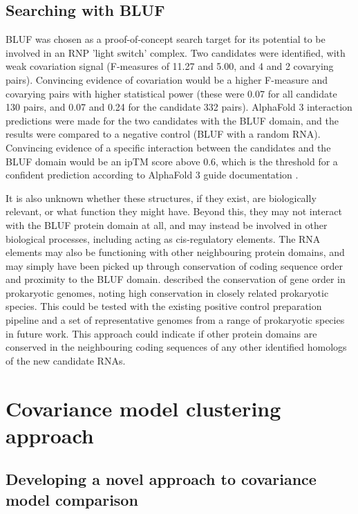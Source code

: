 \subsection{Searching with \ac{BLUF}}

\ac{BLUF} was chosen as a proof-of-concept search target for its potential to be involved in an \ac{RNP} 'light switch' complex.
Two candidates were identified, with weak covariation signal (F-measures of 11.27 and 5.00, and 4 and 2 covarying pairs).
Convincing evidence of covariation would be a higher F-measure and covarying pairs with higher statistical power (these were 0.07 for all candidate 130 pairs, and 0.07 and 0.24 for the candidate 332 pairs).
AlphaFold 3 interaction predictions were made for the two candidates with the \ac{BLUF} domain, and the results were compared to a negative control (BLUF with a random RNA).
Convincing evidence of a specific interaction between the candidates and the \ac{BLUF} domain would be an \ac{ipTM} score above 0.6, which is the threshold for a confident prediction according to AlphaFold 3 guide documentation \citep{Embl-Ebi2026}.

It is also unknown whether these structures, if they exist, are biologically relevant, or what function they might have.
Beyond this, they may not interact with the \ac{BLUF} protein domain at all, and may instead be involved in other biological processes, including acting as cis-regulatory elements.
The RNA elements may also be functioning with other neighbouring protein domains, and may simply have been picked up through conservation of coding sequence order and proximity to the \ac{BLUF} domain.
\citet{Tamames2001} described the conservation of gene order in prokaryotic genomes, noting high conservation in closely related prokaryotic species.
This could be tested with the existing positive control preparation pipeline and a set of representative genomes from a range of prokaryotic species in future work.
This approach could indicate if other protein domains are conserved in the neighbouring coding sequences of any other identified homologs of the new candidate RNAs.

\section{Covariance model clustering approach}

\subsection{Developing a novel approach to covariance model comparison} %

